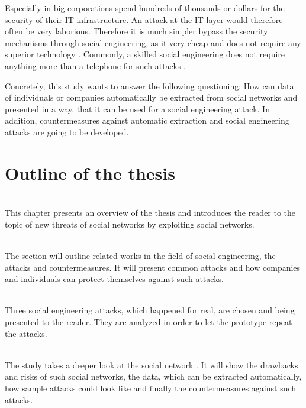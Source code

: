 Especially in big corporations spend hundreds of thousands or dollars for the
security of their IT-infrastructure. An attack at the IT-layer would therefore
often be very laborious. Therefore it is much simpler bypass the security
mechanisms through social engineering, as it very cheap and does not require
any superior technology \cite{winkler1995}. Commonly, a skilled social
engineering does not require anything more than a telephone for such attacks
\cite{mitnick2003}.

Concretely, this study wants to answer the following questioning:
How can data of individuals or companies automatically be extracted
from social networks and presented in a way, that it can be used for a social
engineering attack. In addition, countermeasures against automatic extraction
and social engineering attacks are going to be developed.

\newpage
\section{Outline of the thesis}

\vspace{0.5em}\\
\noindent This chapter presents an overview of the thesis and introduces the
reader to the topic of new threats of social networks by exploiting social
networks.

\vspace{0.5em}\\
\noindent The section will outline related works in the field of social
engineering, the attacks and countermeasures. It will present common attacks
and how companies and individuals can protect themselves against such attacks.

\vspace{0.5em}\\
\noindent Three social engineering attacks, which happened for real, are chosen
and being presented to the reader. They are analyzed in order to let the
prototype repeat the attacks.

\vspace{0.5em}\\
\noindent The study takes a deeper look at the social network \Twitter. It will
show the drawbacks and risks of such social networks, the data, which can be
extracted automatically, how sample attacks could look like and finally the
countermeasures against such attacks.

